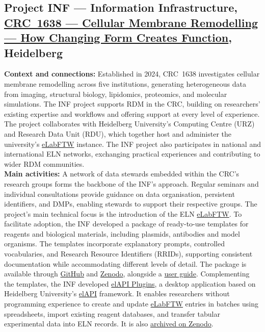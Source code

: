 \documentclass{eceasst}
\newcommand{\elabftw}{\href{https://www.elabftw.net/}{eLabFTW}}
\begin{document}
\subsection{Project INF --- Information Infrastructure,
\href{https://www.sfb1638.de/}
{CRC~1638 --- Cellular Membrane Remodelling ---
How Changing Form Creates Function}, Heidelberg}
\label{subsec:crc1638}
\noindent\textbf{Context and connections:}
Established in 2024, CRC~1638 investigates cellular membrane
remodelling across five institutions, generating heterogeneous
data from imaging, structural biology, lipidomics, proteomics,
and molecular simulations.
The INF project supports RDM
in the CRC, building on researchers' existing expertise
and workflows and offering support at every level of experience.
The project collaborates with Heidelberg University's
Computing Centre (URZ) and Research Data Unit (RDU), which
together host and administer the university's \elabftw{}
instance.
The INF project also participates in national and international ELN networks,
exchanging practical experiences and contributing to wider RDM communities.
\\
\noindent\textbf{Main activities:}
A network of data stewards embedded within the CRC's research
groups forms the backbone of the INF's approach.
Regular seminars and individual consultations provide
guidance on data organisation, persistent
identifiers, and DMPs, enabling stewards to support their respective groups.
The project's main technical focus is the introduction
of the ELN \elabftw.
To facilitate adoption, the INF developed a package of
ready-to-use templates for reagents and biological materials,
including plasmids, antibodies and model organisms.
The templates incorporate explanatory prompts, controlled
vocabularies, and Research Resource Identifiers (RRIDs),
supporting consistent documentation while accommodating
different levels of detail.
The package is available through
\href{https://github.com/sfb1638/elabftw-templates}{GitHub}
and \href{https://doi.org/10.5281/zenodo.21103853}{Zenodo},
alongside a
\href{https://doi.org/10.5281/zenodo.20605340}{user guide}.
Complementing the templates, the INF developed
\href{https://github.com/sfb1638/elAPI_Plugins}{elAPI Plugins},
a desktop application based on Heidelberg University's
\href{https://github.com/uhd-urz/elAPI}{elAPI} framework.
It enables researchers without programming experience to
create and update \elabftw{} entries in batches using
spreadsheets, import existing reagent databases, and
transfer tabular experimental data into ELN records.
It is also
\href{https://doi.org/10.5281/zenodo.23661894}{archived on Zenodo}.
\end{document}
